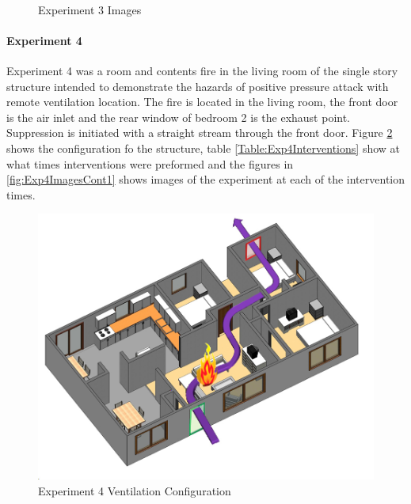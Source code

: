 \documentclass{article}
\begin{document}
\begin{figure}[H]
	\ContinuedFloat 
	\centering 
	 \ 
	\caption{Experiment 3 Images}
	\label{fig:Experiment3ImagesCont3} 
\end{figure}

\paragraph{Experiment 4}\mbox{}

Experiment 4 was a room and contents fire in the living room of the single story structure intended to demonstrate the hazards of positive pressure attack with remote ventilation location. The fire is located in the living room, the front door is the air inlet and the rear window of bedroom 2 is the exhaust point. Suppression is initiated with a straight stream through the front door. Figure \ref{fig:Exp4VentConfig} shows the configuration fo the structure, table \ref{Table:Exp4Interventions} show at what times interventions were preformed and the figures in \ref{fig:Exp4ImagesCont1} shows images of the experiment at each of the intervention times.

\begin{figure}[H]
	\centering
	\includegraphics[width=5in]{0_Images/FireExperiments/Single_Story/Experiment_4.jpg}
	\caption{Experiment 4 Ventilation Configuration}
	\label{fig:Exp4VentConfig}
\end{figure}
\end{document}
